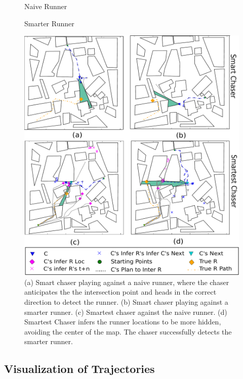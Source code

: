 \documentclass[twoside]{article}
\begin{document}
\begin{figure}[!t]
\begin{center}
\begin{minipage}[t]{0.4\linewidth}
\centerline{\textsf{\footnotesize Naive Runner}}
\end{minipage}
\begin{minipage}[t]{0.4\linewidth}
\centerline{\textsf{\footnotesize Smarter Runner}}
\end{minipage}

\centerline{\includegraphics[width=0.9\columnwidth]{detection_examples.pdf}}
\caption{(a) Smart chaser playing against a naive runner, where the chaser anticipates the the intersection point and heads in the correct direction to detect the runner. (b) Smart chaser playing against a smarter runner. (c) Smartest chaser against the naive runner. (d) Smartest Chaser infers the runner locations to be more hidden, avoiding the center of the map. The chaser successfully detects the smarter runner.} %
\label{fig:exps}
\end{center}
\vspace{-1em}
\end{figure} 

\vspace{-0.25em}
\subsection{Visualization of Trajectories}
\vspace{-0.25em}
\end{document}

